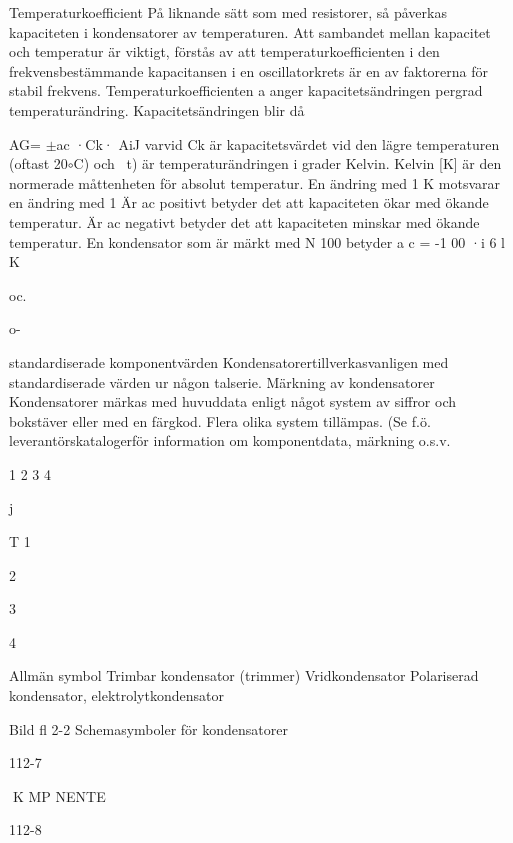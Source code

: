 \documentclass[a4paper,twoside,twocolumn,openright]{book}
\begin{document}
{{Temperaturkoefficient
På liknande sätt som med resistorer, så
påverkas kapaciteten i kondensatorer av
temperaturen. Att sambandet mellan kapacitet och temperatur är viktigt, förstås av att
temperaturkoefficienten i den frekvensbestämmande kapacitansen i en oscillatorkrets
är en av faktorerna för stabil frekvens.
Temperaturkoefficienten a anger kapacitetsändringen pergrad temperaturändring.
Kapacitetsändringen blir då

AG= $\pm$ac ·Ck· AiJ
varvid Ck är kapacitetsvärdet vid den lägre
temperaturen (oftast 20$\circ$C) och ~t) är
temperaturändringen i grader Kelvin.
Kelvin [K] är den normerade måttenheten
för absolut temperatur.
En ändring med 1 K motsvarar en ändring med 1
Är ac positivt betyder det att kapaciteten
ökar med ökande temperatur.
Är ac negativt betyder det att kapaciteten
minskar med ökande temperatur.
En kondensator som är märkt med N 100
betyder a c = -1 00 ·i 6 l K

oc.

o-

standardiserade komponentvärden
Kondensatorertillverkasvanligen med standardiserade värden ur någon talserie.
Märkning av kondensatorer
Kondensatorer märkas med huvuddata enligt något system av siffror och bokstäver
eller med en färgkod. Flera olika system
tillämpas.
(Se f.ö. leverantörskatalogerför information
om komponentdata, märkning o.s.v.

1
2
3
4

j

T
1

2

3

4

Allmän symbol
Trimbar kondensator (trimmer)
Vridkondensator
Polariserad kondensator,
elektrolytkondensator

Bild fl 2-2 Schemasymboler för kondensatorer

112-7

K MP NENTE

112-8

}}
\end{document}
